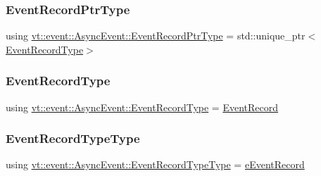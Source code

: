 \mbox{\label{structvt_1_1event_1_1_async_event_a858268f301cb838d33d21cc66232803b}} 
\subsubsection{\texorpdfstring{Event\+Record\+Ptr\+Type}{EventRecordPtrType}}
{\footnotesize\ttfamily using \hyperlink{structvt_1_1event_1_1_async_event_a858268f301cb838d33d21cc66232803b}{vt\+::event\+::\+Async\+Event\+::\+Event\+Record\+Ptr\+Type} =  std\+::unique\+\_\+ptr$<$\hyperlink{structvt_1_1event_1_1_async_event_a5b4ef37db6e5962fdc0e6e0e56e74bc1}{Event\+Record\+Type}$>$}

\mbox{\label{structvt_1_1event_1_1_async_event_a5b4ef37db6e5962fdc0e6e0e56e74bc1}} 
\subsubsection{\texorpdfstring{Event\+Record\+Type}{EventRecordType}}
{\footnotesize\ttfamily using \hyperlink{structvt_1_1event_1_1_async_event_a5b4ef37db6e5962fdc0e6e0e56e74bc1}{vt\+::event\+::\+Async\+Event\+::\+Event\+Record\+Type} =  \hyperlink{structvt_1_1event_1_1_event_record}{Event\+Record}}

\mbox{\label{structvt_1_1event_1_1_async_event_a4cf6f3c99e69b2efeb5fa9b3ffbcca4a}} 
\subsubsection{\texorpdfstring{Event\+Record\+Type\+Type}{EventRecordTypeType}}
{\footnotesize\ttfamily using \hyperlink{namespacevt_1_1event_a1ea9fec44d101bf40b8fd786d44ebed9}{vt\+::event\+::\+Async\+Event\+::\+Event\+Record\+Type\+Type} =  \hyperlink{namespacevt_1_1event_a1ea9fec44d101bf40b8fd786d44ebed9}{e\+Event\+Record}}

